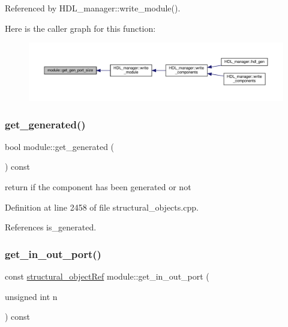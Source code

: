 Referenced by H\+D\+L\+\_\+manager\+::write\+\_\+module().

Here is the caller graph for this function\+:
\nopagebreak
\begin{figure}[H]
\begin{center}
\leavevmode
\includegraphics[width=350pt]{d0/dd3/classmodule_a5e09736fa2af5dd429e02ae2f90d389b_icgraph}
\end{center}
\end{figure}
\mbox{\label{classmodule_a54ba01ce77aa342408c5900c4bcad026}} 
\subsubsection{\texorpdfstring{get\+\_\+generated()}{get\_generated()}}
{\footnotesize\ttfamily bool module\+::get\+\_\+generated (\begin{DoxyParamCaption}{ }\end{DoxyParamCaption}) const}



return if the component has been generated or not 



Definition at line 2458 of file structural\+\_\+objects.\+cpp.



References is\+\_\+generated.

\mbox{\label{classmodule_ac12c995f1c9cdcfde91134b4101a976c}} 
\subsubsection{\texorpdfstring{get\+\_\+in\+\_\+out\+\_\+port()}{get\_in\_out\_port()}}
{\footnotesize\ttfamily const \hyperlink{structural__objects_8hpp_a8ea5f8cc50ab8f4c31e2751074ff60b2}{structural\+\_\+object\+Ref} module\+::get\+\_\+in\+\_\+out\+\_\+port (\begin{DoxyParamCaption}\item[{unsigned int}]{n }\end{DoxyParamCaption}) const}



